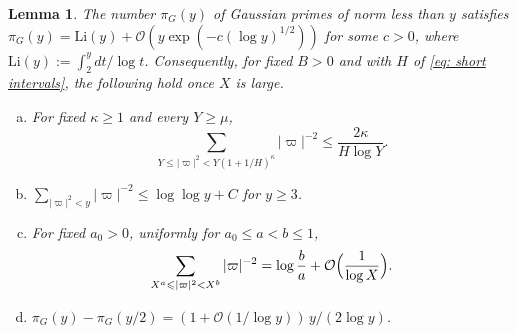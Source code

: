 \documentclass{article}
\numberwithin{equation}{section}
\newtheorem{lemma}{Lemma}
\newcommand{\Le}{\leqslant}
\newcommand{\Ge}{\geqslant}
\begin{document}
\begin{lemma}
\label{lem: prime ideal theorem}
The number $\pi_G(y)$ of Gaussian primes of norm less than $y$ satisfies $\pi_G(y) = \mathrm{Li}(y) + \mathcal{O}(y \exp(-c (\log y)^{1/2}))$ for some $c > 0$, where $\mathrm{Li}(y) := \int_2^y dt/\log t$. Consequently, for fixed $B > 0$ and with $H$ of \eqref{eq: short intervals}, the following hold once $X$ is large.
\begin{enumerate}[(a)]
\item For fixed $\kappa \Ge 1$ and every $Y \Ge \mu$,
\begin{equation*}
\sum_{Y \Le |\varpi|^2 < Y(1 + 1/H)^{\kappa}} |\varpi|^{-2} \Le \frac{2\kappa}{H \log Y}.
\end{equation*}
\item $\sum_{|\varpi|^2 < y} |\varpi|^{-2} \Le \log\log y + C$ for $y \Ge 3$.
\item For fixed $a_0 > 0$, uniformly for $a_0 \Le a < b \Le 1$,
\begin{equation*}
\sum_{X^a \Le |\varpi|^2 < X^b} |\varpi|^{-2} = \log\frac{b}{a} + \mathcal{O}\Bigl( \frac{1}{\log X} \Bigr).
\end{equation*}
\item $\pi_G(y) - \pi_G(y/2) = (1 + \mathcal{O}(1/\log y))\, y/(2\log y)$.
\end{enumerate}
\end{lemma}
\end{document}
